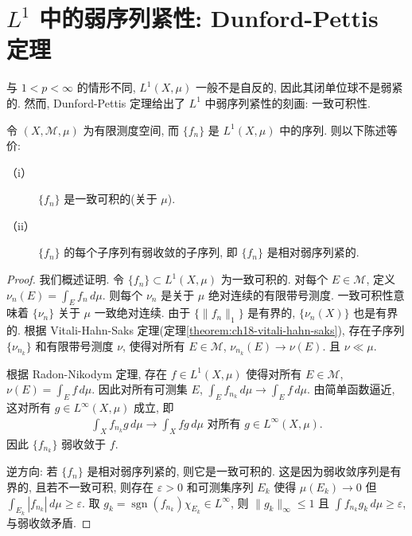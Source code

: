 \documentclass[../../main.tex]{subfiles}
\begin{document}
\section{$L^{1}$ 中的弱序列紧性: Dunford-Pettis 定理}\label{section:ch19-dunford-pettis}

与 $1<p<\infty$ 的情形不同, $L^{1}(X,\mu)$ 一般不是自反的, 因此其闭单位球不是弱紧的. 然而, Dunford-Pettis 定理给出了 $L^{1}$ 中弱序列紧性的刻画: 一致可积性.

\begin{theorem}\label{theorem:ch19-dunford-pettis}
令 $(X,\mathcal{M},\mu)$ 为有限测度空间, 而 $\{f_{n}\}$ 是 $L^{1}(X,\mu)$ 中的序列. 则以下陈述等价:
\begin{description}
\item[（i）] $\{f_{n}\}$ 是一致可积的(关于 $\mu$).
\item[（ii）] $\{f_{n}\}$ 的每个子序列有弱收敛的子序列, 即 $\{f_{n}\}$ 是相对弱序列紧的.
\end{description}
\end{theorem}

\begin{proof}
我们概述证明. 令 $\{f_{n}\}\subset L^{1}(X,\mu)$ 为一致可积的. 对每个 $E\in\mathcal{M}$, 定义 $\nu_{n}(E)=\int_{E}f_{n}\,d\mu$. 则每个 $\nu_{n}$ 是关于 $\mu$ 绝对连续的有限带号测度. 一致可积性意味着 $\{\nu_{n}\}$ 关于 $\mu$ 一致绝对连续. 由于 $\{\|f_{n}\|_{1}\}$ 是有界的, $\{\nu_{n}(X)\}$ 也是有界的. 根据 Vitali-Hahn-Saks 定理(定理\cref{theorem:ch18-vitali-hahn-saks}), 存在子序列 $\{\nu_{n_{k}}\}$ 和有限带号测度 $\nu$, 使得对所有 $E\in\mathcal{M}$, $\nu_{n_{k}}(E)\to\nu(E)$. 且 $\nu\ll\mu$.

根据 Radon-Nikodym 定理, 存在 $f\in L^{1}(X,\mu)$ 使得对所有 $E\in\mathcal{M}$, $\nu(E)=\int_{E}f\,d\mu$. 因此对所有可测集 $E$, $\int_{E}f_{n_{k}}\,d\mu\to\int_{E}f\,d\mu$. 由简单函数逼近, 这对所有 $g\in L^{\infty}(X,\mu)$ 成立, 即
\begin{align*}
\int_{X}f_{n_{k}}g\,d\mu\to\int_{X}fg\,d\mu\text{ 对所有 }g\in L^{\infty}(X,\mu).
\end{align*}
因此 $\{f_{n_{k}}\}$ 弱收敛于 $f$.

逆方向: 若 $\{f_{n}\}$ 是相对弱序列紧的, 则它是一致可积的. 这是因为弱收敛序列是有界的, 且若不一致可积, 则存在 $\varepsilon>0$ 和可测集序列 $E_{k}$ 使得 $\mu(E_{k})\to 0$ 但 $\int_{E_{k}}|f_{n_{k}}|\,d\mu\geqslant\varepsilon$. 取 $g_{k}=\operatorname{sgn}(f_{n_{k}})\chi_{E_{k}}\in L^{\infty}$, 则 $\|g_{k}\|_{\infty}\leqslant 1$ 且 $\int f_{n_{k}}g_{k}\,d\mu\geqslant\varepsilon$, 与弱收敛矛盾.
\end{proof}
\end{document}
